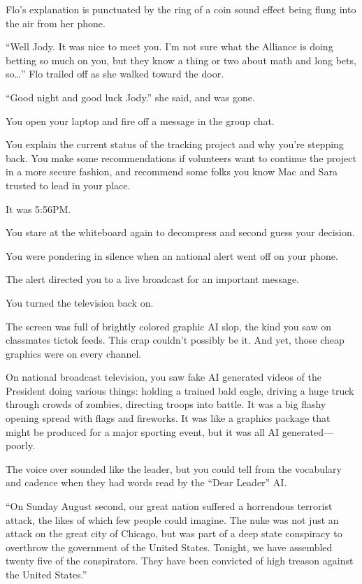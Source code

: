 \documentclass[17pt, twoside, a5paper, openright, extrafontsizes]{memoir}
\begin{document}
Flo's explanation is punctuated by the ring of a coin sound effect being
flung into the air from her phone.

``Well Jody. It was nice to meet you. I'm not sure what the Alliance is
doing betting so much on you, but they know a thing or two about math
and long bets, so\ldots{}'' Flo trailed off as she walked toward the
door.

``Good night and good luck Jody.'' she said, and was gone.

You open your laptop and fire off a message in the group chat.

You explain the current status of the tracking project and why you're
stepping back. You make some recommendations if volunteers want to
continue the project in a more secure fashion, and recommend some folks
you know Mac and Sara trusted to lead in your place.

It was 5:56PM.

You stare at the whiteboard again to decompress and second guess your
decision.

You were pondering in silence when an national alert went off on your
phone.

The alert directed you to a live broadcast for an important message.

You turned the television back on.

The screen was full of brightly colored graphic AI slop, the kind you
saw on classmates tictok feeds. This crap couldn't possibly be it. And
yet, those cheap graphics were on every channel.

On national broadcast television, you saw fake AI generated videos of
the President doing various things: holding a trained bald eagle,
driving a huge truck through crowds of zombies, directing troops into
battle. It was a big flashy opening spread with flags and fireworks. It
was like a graphics package that might be produced for a major sporting
event, but it was all AI generated---poorly.

The voice over sounded like the leader, but you could tell from the
vocabulary and cadence when they had words read by the ``Dear Leader''
AI.

``On Sunday August second, our great nation suffered a horrendous
terrorist attack, the likes of which few people could imagine. The nuke
was not just an attack on the great city of Chicago, but was part of a
deep state conspiracy to overthrow the government of the United States.
Tonight, we have assembled twenty five of the conspirators. They have
been convicted of high treason against the United States.''
\end{document}

